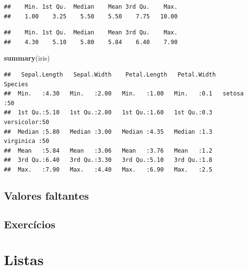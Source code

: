 \documentclass[
]{book}
\newenvironment{Shaded}{\begin{snugshade}}{\end{snugshade}}
\newcommand{\FunctionTok}[1]{\textcolor[rgb]{0.13,0.29,0.53}{\textbf{#1}}}
\newcommand{\NormalTok}[1]{#1}
\newcommand{\SpecialCharTok}[1]{\textcolor[rgb]{0.81,0.36,0.00}{\textbf{#1}}}
\begin{document}
\begin{verbatim}
##    Min. 1st Qu.  Median    Mean 3rd Qu.    Max. 
##    1.00    3.25    5.50    5.50    7.75   10.00
\end{verbatim}

\begin{Shaded}
\end{Shaded}

\begin{verbatim}
##    Min. 1st Qu.  Median    Mean 3rd Qu.    Max. 
##    4.30    5.10    5.80    5.84    6.40    7.90
\end{verbatim}

\begin{Shaded}
\begin{Highlighting}[]
\FunctionTok{summary}\NormalTok{(iris)  }
\end{Highlighting}
\end{Shaded}

\begin{verbatim}
##   Sepal.Length   Sepal.Width    Petal.Length   Petal.Width        Species  
##  Min.   :4.30   Min.   :2.00   Min.   :1.00   Min.   :0.1   setosa    :50  
##  1st Qu.:5.10   1st Qu.:2.80   1st Qu.:1.60   1st Qu.:0.3   versicolor:50  
##  Median :5.80   Median :3.00   Median :4.35   Median :1.3   virginica :50  
##  Mean   :5.84   Mean   :3.06   Mean   :3.76   Mean   :1.2                  
##  3rd Qu.:6.40   3rd Qu.:3.30   3rd Qu.:5.10   3rd Qu.:1.8                  
##  Max.   :7.90   Max.   :4.40   Max.   :6.90   Max.   :2.5
\end{verbatim}

\subsection{Valores faltantes}\label{valores-faltantes}

\subsection{Exercícios}\label{exercuxedcios-3}

\section{Listas}\label{listas}
\end{document}
